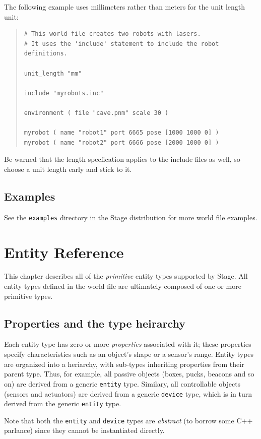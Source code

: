 \documentclass[11pt]{report}
\begin{document}
\noindent The following example uses millimeters rather than meters
for the unit length unit:
\begin{quote}
\begin{verbatim}
# This world file creates two robots with lasers.
# It uses the 'include' statement to include the robot definitions.

unit_length "mm"

include "myrobots.inc"

environment ( file "cave.pnm" scale 30 )

myrobot ( name "robot1" port 6665 pose [1000 1000 0] )
myrobot ( name "robot2" port 6666 pose [2000 1000 0] )
\end{verbatim}
\end{quote}
Be warned that the length specfication applies to the include files as well,
so choose a unit length early and stick to it.


\section{Examples}

See the {\tt examples} directory in the Stage distribution for more
world file examples.


\chapter{Entity Reference}

This chapter describes all of the {\em primitive} entity types
supported by Stage.  All entity types defined in the world file are
ultimately composed of one or more primitive types.


\section{Properties and the type heirarchy}

Each entity type has zero or more {\em properties} associated with it;
these properties specify characteristics such as an object's shape or
a sensor's range.  Entity types are organized into a heriarchy, with
sub-types inheriting properties from their parent type.  Thus, for
example, all passive objects (boxes, pucks, beacons and so on) are
derived from a generic \verb'entity' type.  Similary, all controllable
objects (sensors and actuators) are derived from a generic
\verb'device' type, which is in turn derived from the generic
\verb'entity' type.

Note that both the \verb'entity' and \verb'device' types are {\em
abstract} (to borrow some C++ parlance) since they cannot be
instantiated directly.
\end{document}
